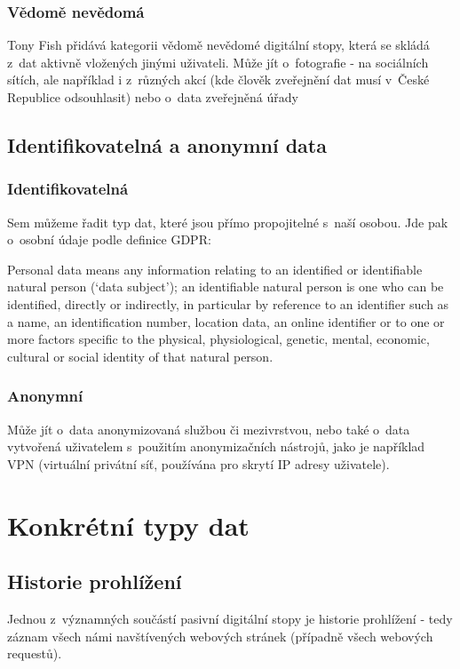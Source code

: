 \subsubsection{Vědomě nevědomá}

Tony Fish přidává kategorii vědomě nevědomé digitální stopy, která se skládá z~dat aktivně vložených jinými uživateli\citep{fish-digital-footprint}.
Může jít o~fotografie - na sociálních sítích, ale například i z~různých akcí (kde člověk zveřejnění dat musí v~České Republice odsouhlasit) nebo o~data zveřejněná úřady

\subsection{Identifikovatelná a anonymní data}

\subsubsection{Identifikovatelná}

Sem můžeme řadit typ dat, které jsou přímo propojitelné s~naší osobou. Jde pak o~osobní údaje podle definice GDPR:

\begin{displayquote}
Personal data means any information relating to an identified or identifiable natural person (‘data subject’); an identifiable natural person is one who can be identified, directly or indirectly, in particular by reference to an identifier such as a name, an identification number, location data, an online identifier or to one or more factors specific to the physical, physiological, genetic, mental, economic, cultural or social identity of that natural person.\citep{gdpr}
\end{displayquote}

\subsubsection{Anonymní}

Může jít o~data anonymizovaná službou či mezivrstvou, nebo také o~data vytvořená uživatelem s~použitím anonymizačních nástrojů, jako je například VPN (virtuální privátní síť, používána pro skrytí IP adresy uživatele).

\section{Konkrétní typy dat}

\subsection{Historie prohlížení}
Jednou z~významných součástí pasivní digitální stopy je historie prohlížení - tedy záznam všech námi navštívených webových stránek (případně všech webových requestů).

